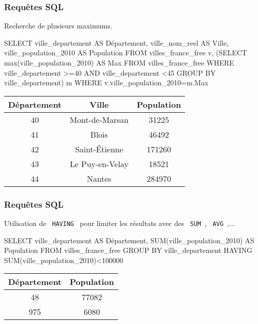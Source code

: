 \begin{frame}[fragile]
\frametitle{Requêtes SQL}

Recherche de plusieurs maximums.

\begin{GrayBox}[0.85\textwidth]
\begin{semiverbatim}\small
SELECT ville_departement AS Département, ville_nom_reel AS Ville,
    ville_population_2010 AS Population
FROM villes_france_free v,
    (SELECT max(ville_population_2010) AS Max FROM villes_france_free
        WHERE ville_departement >=40 AND ville_departement <45
            GROUP BY ville_departement) m
WHERE v.ville_population_2010=m.Max
\end{semiverbatim}
\end{GrayBox}

\begin{center}
\begin{tabular}{|c|c|c|}
\hline
\textbf{Département} & \textbf{Ville} & \textbf{Population} \\
\hline
40 & Mont-de-Marsan & 31225 \\
\hline
41 & Blois & 46492 \\
\hline
42 & Saint-Étienne & 171260 \\
\hline
43 & Le Puy-en-Velay & 18521 \\
\hline
44 & Nantes & 284970 \\
\hline
\end{tabular}
\end{center}

\end{frame}

\begin{frame}[fragile]
\frametitle{Requêtes SQL}

Utilisation de \verb? HAVING ? pour limiter les résultats avec des \verb? SUM ?, \verb? AVG ?,...

\begin{GrayBox}[0.85\textwidth]
\begin{semiverbatim}\small
SELECT ville_departement AS Département,
    SUM(ville_population_2010) AS Population
FROM villes_france_free
GROUP BY ville_departement
HAVING SUM(ville_population_2010)<100000
\end{semiverbatim}
\end{GrayBox}

\begin{center}
\begin{tabular}{|c|c|}
\hline
\textbf{Département} & \textbf{Population} \\
\hline
48 & 77082 \\
\hline
975 & 6080 \\
\hline
\end{tabular}
\end{center}

\end{frame}

